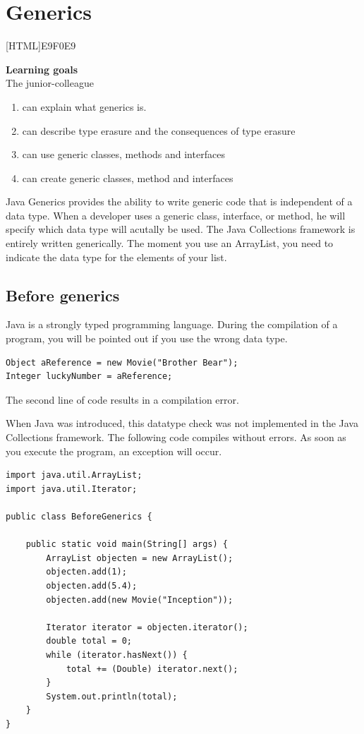 \chapter{Generics}
\label{chap:generics}

[HTML]{E9F0E9}{\parbox{\textwidth}{%
\noindent \textbf{Learning goals}\\
The junior-colleague
\begin{enumerate}[nolistsep]
\item can explain what generics is.
\item can describe type erasure and the consequences of type erasure
\item can use generic classes, methods and interfaces
\item can create generic classes, method and interfaces
\end{enumerate}}}

\begin{summary}
Java Generics provides the ability to write generic code that is independent of a data type. When a developer uses a generic class,  interface,  or method,  he will specify which data type will acutally be used. The Java Collections framework is entirely written generically. The moment you use an ArrayList,  you need to indicate the data type for the elements of your list.
\end{summary}

\section{Before generics}
Java is a strongly typed programming language.  During the compilation of a program, you will be pointed out if you use the wrong data type.

\begin{lstlisting}
Object aReference = new Movie("Brother Bear");
Integer luckyNumber = aReference;
\end{lstlisting}

The second line of code results in a compilation error.

 

When Java was introduced, this datatype check was not implemented in the Java Collections framework. The following code compiles without errors.  As soon as you execute the program, an exception will occur.

\begin{lstlisting}
import java.util.ArrayList;
import java.util.Iterator;

public class BeforeGenerics {

	public static void main(String[] args) {
		ArrayList objecten = new ArrayList();
		objecten.add(1);
		objecten.add(5.4);
		objecten.add(new Movie("Inception"));

		Iterator iterator = objecten.iterator();
		double total = 0;
		while (iterator.hasNext()) {
			total += (Double) iterator.next();
		}
		System.out.println(total);
	}
}
\end{lstlisting}


